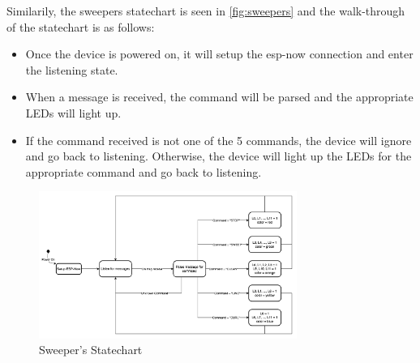 \documentclass{article}
\begin{document}
Similarily, the sweepers statechart is seen in \autoref{fig:sweepers} and the walk-through of the statechart is as follows:
\begin{itemize}
    \item Once the device is powered on, it will setup the esp-now connection and enter the listening state.
    \item When a message is received, the command will be parsed and the appropriate LEDs will light up.
    \item If the command received is not one of the 5 commands, the device will ignore and go back to listening. Otherwise, the device will light up the LEDs for the appropriate command and go back to listening.
\end{itemize}

\begin{figure}[ht!]
    \centering
    \includegraphics[width=0.75\textwidth]{sweeper_statechart.png}
    \caption{Sweeper's Statechart}
    \label{fig:sweepers}
\end{figure}

\end{document}
